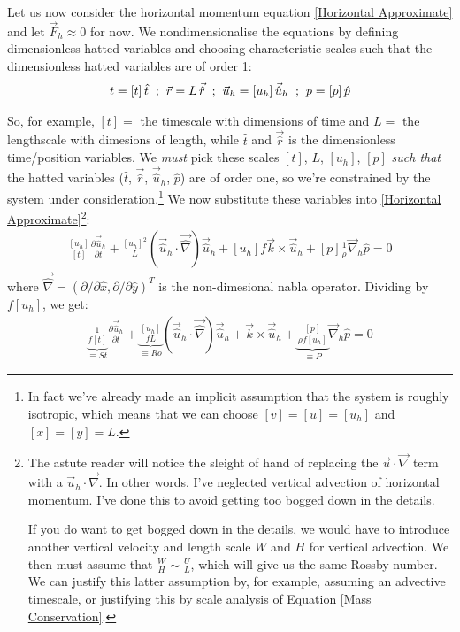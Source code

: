 Let us now consider the horizontal momentum equation \ref{Horizontal Approximate} and let \(\vec{F}_h\approx 0\) for now. We nondimensionalise the equations by defining dimensionless hatted variables and choosing characteristic scales such that the dimensionless hatted variables are of order 1:
\begin{align*}
    t=[t]\,\hat{t}\hspace{2mm}\text{;}\hspace{2mm}
    \vec{r}=L\,\vec{\hat{r}}\hspace{2mm}\text{;}\hspace{2mm}
    \vec{u}_h=[u_h]\,\vec{\hat{u}}_h\hspace{2mm}\text{;}\hspace{2mm}
    p=[p]\,\hat{p}
\end{align*}

So, for example, \([t]= \) the timescale with dimensions of time and \(L= \) the lengthscale with dimesions of length, while \(\hat{t}\) and \(\vec{\hat{r}}\) is the dimensionless time/position variables. We \textit{must} pick these scales \([t]\), \(L\), \([u_h]\), \([p]\) \textit{such that} the hatted variables (\(\hat{t}\), \(\vec{\hat{r}}\), \(\vec{\hat{u}}_h\), \(\hat{p}\)) are of order one, so we're constrained by the system under consideration.\footnote{
    In fact we've already made an implicit assumption that the system is roughly isotropic, which means that we can choose \([v]=[u]=[u_h]\) and \([x]=[y]=L\).  
} We now substitute these variables into \ref{Horizontal Approximate}\footnote{
    The astute reader will notice the sleight of hand of replacing the \(\vec{u}\cdot\vec{\nabla}\) term with a \(\vec{u}_h\cdot\vec{\nabla}\). In other words, I've neglected vertical advection of horizontal momentum. I've done this to avoid getting too bogged down in the details.

    If you do want to get bogged down in the details, we would have to introduce another vertical velocity and length scale \(W\) and \(H\) for vertical advection. We then must assume that \(\frac{W}{H}\sim\frac{U}{L}\), which will give us the same Rossby number. We can justify this latter assumption by, for example, assuming an advective timescale, or justifying this by scale analysis of Equation \ref{Mass Conservation}.
}:
\begin{align*}
    \frac{[u_h]}{[t]}\frac{\partial\vec{\hat{u}}_h}{\partial t}+\frac{[u_h]^2}{L}\left( \vec{\hat{u}}_h\cdot\vec{\hat{\nabla}} \right)\vec{\hat{u}}_h+[u_h]f\vec{k}\times\vec{\hat{u}}_h+[p]\frac{1}{\rho}\vec{\nabla}_h\hat{p}=0
\end{align*}
where \(\vec{\hat{\nabla}}=(\partial/\partial \hat{x},\partial/\partial \hat{y})^T\) is the non-dimesional nabla operator. Dividing by \(f[u_h]\), we get:
\begin{align*}
    \underbrace{\boxed{\frac{1}{f[t]}}}_{\equiv St}\frac{\partial\vec{\hat{u}}_h}{\partial t}+\underbrace{\boxed{\frac{[u_h]}{fL}}}_{\equiv Ro}\left( \vec{\hat{u}}_h\cdot\vec{\hat{\nabla}} \right)\vec{\hat{u}}_h+\vec{k}\times\vec{\hat{u}}_h+\underbrace{\boxed{\frac{[p]}{\rho f [u_h]}}}_{\equiv P}\vec{\nabla}_h\hat{p}=0
\end{align*}

